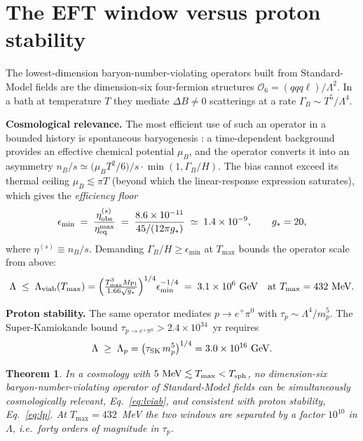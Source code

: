 \documentclass[12pt,a4paper]{article}
\newtheorem{theorem}{Theorem}
\begin{document}
\section{The EFT window versus proton stability}
\label{sec:eft}

The lowest-dimension baryon-number-violating operators built from
Standard-Model fields are the dimension-six four-fermion structures
$\mathcal{O}_{6}=(qqq\ell)/\Lambda^{2}$.  In a bath at temperature $T$
they mediate $\Delta B\neq0$ scatterings at a rate
$\Gamma_{B}\sim T^{5}/\Lambda^{4}$.

\medskip
\noindent\textbf{Cosmological relevance.}
The most efficient use of such an operator in a bounded history is
spontaneous baryogenesis \cite{CohenKaplan}: a time-dependent background
provides an effective chemical potential $\mu_{B}$, and the operator
converts it into an asymmetry
$n_{B}/s\simeq\bigl(\mu_{B}T^{2}/6\bigr)/s\cdot\min(1,\Gamma_{B}/H)$.
The bias cannot exceed its thermal ceiling $\mu_{B}\lesssim\pi T$
(beyond which the linear-response expression saturates), which gives the
\emph{efficiency floor}
\begin{equation}
\epsilon_{\min}
 \;=\;\frac{\eta_{\rm obs}^{(s)}}{\eta_{\rm eq}^{\max}}
 \;=\;\frac{8.6\times10^{-11}}{45/(12\pi g_{*})}
 \;\simeq\;1.4\times10^{-9},
\qquad g_{*}=20 ,
\label{eq:eps}
\end{equation}
where $\eta^{(s)}\equiv n_{B}/s$.  Demanding
$\Gamma_{B}/H\ge\epsilon_{\min}$ at $T_{\max}$ bounds the operator scale
from above:
\begin{equation}
\Lambda\;\le\;\Lambda_{\rm viab}(T_{\max})
=\Bigl(\tfrac{T_{\max}^{3}M_{\rm Pl}}{1.66\sqrt{g_{*}}}\Bigr)^{1/4}
 \epsilon_{\min}^{-1/4}
\;=\;3.1\times10^{6}~\text{GeV}
\quad\text{at }T_{\max}=432~\text{MeV}.
\label{eq:lviab}
\end{equation}

\noindent\textbf{Proton stability.}
The same operator mediates $p\to e^{+}\pi^{0}$ with
$\tau_{p}\sim\Lambda^{4}/m_{p}^{5}$.  The Super-Kamiokande bound
$\tau_{p\to e^{+}\pi^{0}}>2.4\times10^{34}$~yr \cite{SuperK} requires
\begin{equation}
\Lambda\;\ge\;\Lambda_{p}
=\bigl(\tau_{\rm SK}\,m_{p}^{5}\bigr)^{1/4}
=3.0\times10^{16}~\text{GeV}.
\label{eq:lp}
\end{equation}

\begin{theorem}
In a cosmology with $5~\mathrm{MeV}\lesssim T_{\max}<T_{\rm sph}$, no
dimension-six baryon-number-violating operator of Standard-Model fields
can be simultaneously cosmologically relevant,
Eq.~\eqref{eq:lviab}, and consistent with proton stability,
Eq.~\eqref{eq:lp}.  At $T_{\max}=432$~MeV the two windows are separated
by a factor $10^{10}$ in $\Lambda$, i.e.\ forty orders of magnitude in
$\tau_{p}$.
\end{theorem}
\end{document}
